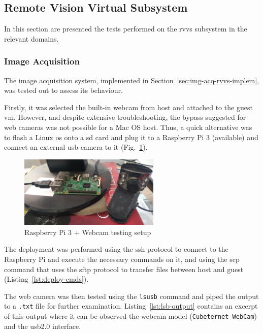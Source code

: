 \subsection{Remote Vision Virtual Subsystem}%
\label{sec:remote-visi-subsyst-testing}
In this section are presented the tests performed on the \gls{rvvs} subsystem in
the relevant domains.
%
\subsubsection{Image Acquisition}%
\label{sec:img-acq-rvvs-test}
The image acquisition system, implemented in
Section~\ref{sec:img-acq-rvvs-implem}, was tested out to assess its behaviour.

Firstly, it was selected the built-in webcam from host and attached to the guest
\gls{vm}. However,
and despite extensive troubleshooting, the bypass suggested for web
cameras\cite{webcam-bypass} was not possible for a Mac OS host. Thus, a quick
alternative was to flash a Linux \gls{os} onto a \gls{sd} card and plug it to a
Raspberry Pi 3 (available) and connect an external \gls{usb} camera to it (Fig.~\ref{fig:rasp-cam-test}).
\begin{figure}[!hbt]
\centering
    \includegraphics[width=0.6\textwidth]{./img/rasp-cam-test.jpg}
  \caption{Raspberry Pi 3 + Webcam testing setup}%
\label{fig:rasp-cam-test}
\end{figure}
%

The deployment was performed using the \gls{ssh} protocol to connect to the
Raspberry Pi and execute the necessary commands on it, and using the \gls{scp}
command that uses the \gls{sftp} protocol to transfer files between host and
guest (Listing~\ref{lst:deploy-cmds}).
%

The web camera was then tested using the \texttt{lsusb} command and piped the
output to a \texttt{.txt} file for further
examination. Listing~\ref{lst:lsb-output} contains an excerpt of this output
where it can be observed the
webcam model (\texttt{Cubeternet WebCam}) and the \gls{usb}2.0 interface.
%

